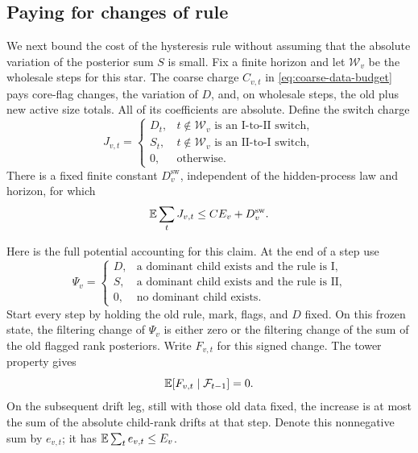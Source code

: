 \subsection{Paying for changes of rule}

We next bound the cost of the hysteresis rule without assuming that the
absolute variation of the posterior sum \(S\) is small.  Fix a finite
horizon and let \(\mathcal W_v\) be the wholesale steps for this star.
The coarse charge \(C_{v,t}\) in \eqref{eq:coarse-data-budget} pays
core-flag changes, the variation of \(D\), and, on wholesale steps,
the old plus new active size totals.  All of its coefficients are
absolute.  Define the switch charge
\begin{equation}
 J_{v,t}=
 \begin{cases}
 D_t,&t\notin\mathcal W_v\text{ is an I-to-II switch},\\
 S_t,&t\notin\mathcal W_v\text{ is an II-to-I switch},\\
 0,&\text{otherwise}.
 \end{cases}
 \label{eq:switch-charge}
\end{equation}
There is a fixed finite constant \(D_v^{\mathrm{sw}}\), independent
of the hidden-process law and horizon, for which
\begin{equation}
 \mathbb E\sum_tJ_{v,t}\le C E_v+D_v^{\mathrm{sw}}.
 \label{eq:switch-budget}
\end{equation}

Here is the full potential accounting for this claim.  At the end of a
step use
\begin{equation}
 \Psi_v=
 \begin{cases}
 D,&\text{a dominant child exists and the rule is I},\\
 S,&\text{a dominant child exists and the rule is II},\\
 0,&\text{no dominant child exists}.
 \end{cases}
 \label{eq:switch-potential}
\end{equation}
Start every step by holding the old rule, mark, flags, and \(D\) fixed.
On this frozen state, the filtering change of \(\Psi_v\) is either
zero or the filtering change of the sum of the old flagged rank
posteriors.  Write \(F_{v,t}\) for this signed change.  The tower
property gives
\begin{equation}
 \mathbb E[F_{v,t}\mid\mathcal F_{t-1}]=0.
 \label{eq:switch-filtering-zero}
\end{equation}
On the subsequent drift leg, still with those old data fixed, the
increase is at most the sum of the absolute child-rank drifts at that
step.  Denote this nonnegative sum by \(e_{v,t}\); it has
\(\mathbb E\sum_t e_{v,t}\le E_v\).

